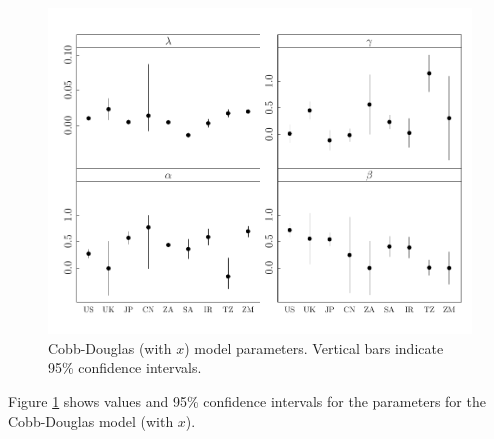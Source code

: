\documentclass[preprint,authoryear,12pt]{elsarticle}\usepackage{graphicx, color}
\makeatletter
\def\maxwidth{ %
  \ifdim\Gin@nat@width>\linewidth
    \linewidth
  \else
    \Gin@nat@width
  \fi
}
\newenvironment{kframe}{%
 \def\at@end@of@kframe{}%
 \ifinner\ifhmode%
  \def\at@end@of@kframe{\end{minipage}}%
  \begin{minipage}{\columnwidth}%
 \fi\fi%
 \def\FrameCommand##1{\hskip\@totalleftmargin \hskip-\fboxsep
 \colorbox{shadecolor}{##1}\hskip-\fboxsep
     \hskip-\linewidth \hskip-\@totalleftmargin \hskip\columnwidth}%
 \MakeFramed {\advance\hsize-\width
   \@totalleftmargin\z@ \linewidth\hsize
   \@setminipage}}%
 {\par\unskip\endMakeFramed%
 \at@end@of@kframe}
\newenvironment{knitrout}{}{} %
\makeatother
\begin{document}
\begin{knitrout}
\begin{kframe}
{\ttfamily\noindent\color{warningcolor}{Warning: step factor 0.000488281 reduced below 'minFactor' of 0.000976562}}\end{kframe}\begin{figure}[]

\includegraphics[width=\maxwidth]{figure/CDx_Params_Graph} \caption[Cobb-Douglas (with $x$) model parameters]{Cobb-Douglas (with $x$) model parameters. Vertical bars indicate 95\% confidence intervals.\label{fig:CDx_Params_Graph}}
\end{figure}


\end{knitrout}


Figure \ref{fig:CDx_Params_Graph} shows values and 95\% confidence intervals for the parameters for the Cobb-Douglas model (with $x$).
\end{document}
